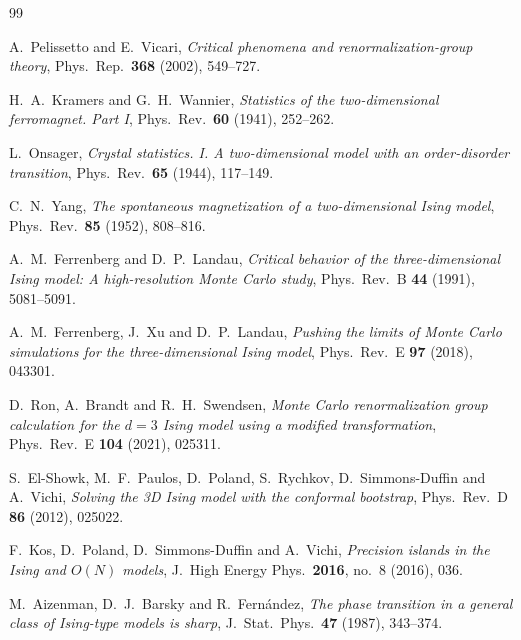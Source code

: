 \begin{thebibliography}{99}

A.~Pelissetto and E.~Vicari,
\emph{Critical phenomena and renormalization-group theory},
Phys.\ Rep.\ \textbf{368} (2002), 549--727. 

H.~A.~Kramers and G.~H.~Wannier,
\emph{Statistics of the two-dimensional ferromagnet. Part I},
Phys.\ Rev.\ \textbf{60} (1941), 252--262. 

L.~Onsager,
\emph{Crystal statistics. I. A two-dimensional model with an order-disorder transition},
Phys.\ Rev.\ \textbf{65} (1944), 117--149. 

C.~N.~Yang,
\emph{The spontaneous magnetization of a two-dimensional Ising model},
Phys.\ Rev.\ \textbf{85} (1952), 808--816. 

A.~M.~Ferrenberg and D.~P.~Landau,
\emph{Critical behavior of the three-dimensional Ising model: A high-resolution Monte Carlo study},
Phys.\ Rev.\ B \textbf{44} (1991), 5081--5091. 

A.~M.~Ferrenberg, J.~Xu and D.~P.~Landau,
\emph{Pushing the limits of Monte Carlo simulations for the three-dimensional Ising model},
Phys.\ Rev.\ E \textbf{97} (2018), 043301. 

D.~Ron, A.~Brandt and R.~H.~Swendsen,
\emph{Monte Carlo renormalization group calculation for the $d=3$ Ising model using a modified transformation},
Phys.\ Rev.\ E \textbf{104} (2021), 025311. 

S.~El-Showk, M.~F.~Paulos, D.~Poland, S.~Rychkov, D.~Simmons-Duffin and A.~Vichi,
\emph{Solving the 3D Ising model with the conformal bootstrap},
Phys.\ Rev.\ D \textbf{86} (2012), 025022. 

F.~Kos, D.~Poland, D.~Simmons-Duffin and A.~Vichi,
\emph{Precision islands in the Ising and $O(N)$ models},
J.\ High Energy Phys.\ \textbf{2016}, no.~8 (2016), 036. 

M.~Aizenman, D.~J.~Barsky and R.~Fern\'andez,
\emph{The phase transition in a general class of Ising-type models is sharp},
J.\ Stat.\ Phys.\ \textbf{47} (1987), 343--374. 


\end{thebibliography}
